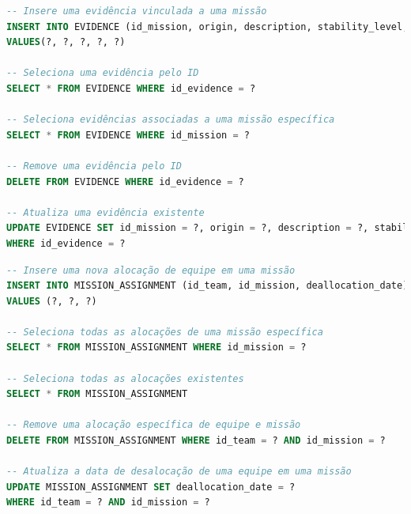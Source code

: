 \documentclass[12pt,a4paper]{report}
\begin{document}
\begin{lstlisting}[language=SQL, caption=Consultas feitas em EvidenceDAO]
-- Insere uma evidência vinculada a uma missão
INSERT INTO EVIDENCE (id_mission, origin, description, stability_level, id_evidence) 
VALUES(?, ?, ?, ?, ?)

-- Seleciona uma evidência pelo ID
SELECT * FROM EVIDENCE WHERE id_evidence = ?

-- Seleciona evidências associadas a uma missão específica
SELECT * FROM EVIDENCE WHERE id_mission = ?

-- Remove uma evidência pelo ID
DELETE FROM EVIDENCE WHERE id_evidence = ?

-- Atualiza uma evidência existente
UPDATE EVIDENCE SET id_mission = ?, origin = ?, description = ?, stability_level = ? 
WHERE id_evidence = ?
\end{lstlisting}

\begin{lstlisting}[language=SQL, caption=Consultas feitas em MissionAssignmentDAO]
-- Insere uma nova alocação de equipe em uma missão
INSERT INTO MISSION_ASSIGNMENT (id_team, id_mission, deallocation_date) 
VALUES (?, ?, ?)

-- Seleciona todas as alocações de uma missão específica
SELECT * FROM MISSION_ASSIGNMENT WHERE id_mission = ?

-- Seleciona todas as alocações existentes
SELECT * FROM MISSION_ASSIGNMENT

-- Remove uma alocação específica de equipe e missão
DELETE FROM MISSION_ASSIGNMENT WHERE id_team = ? AND id_mission = ?

-- Atualiza a data de desalocação de uma equipe em uma missão
UPDATE MISSION_ASSIGNMENT SET deallocation_date = ? 
WHERE id_team = ? AND id_mission = ?
\end{lstlisting}
\end{document}
